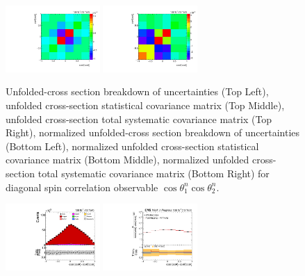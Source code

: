 \begin{refsection}
\begin{figure}[htb]
\begin{center}
 \includegraphics[width=0.32\textwidth]{fig_fullRun2UL/unfolding/combined/StatCovMatrixNorm_rebinnedB_c_nn.pdf}
 \includegraphics[width=0.32\textwidth]{fig_fullRun2UL/unfolding/combined/TotalSystCovMatrixNorm_rebinnedB_c_nn.pdf} \\
\caption{Unfolded-cross section breakdown of uncertainties (Top Left), unfolded cross-section statistical covariance matrix (Top Middle), unfolded cross-section total systematic covariance matrix (Top Right), normalized unfolded-cross section breakdown of uncertainties (Bottom Left), normalized unfolded cross-section statistical covariance matrix (Bottom Middle), normalized unfolded cross-section total systematic covariance matrix (Bottom Right) for diagonal spin correlation observable $\cos\theta_{1}^{n}\cos\theta_{2}^{n}$.}
\label{fig:c_nn_uncertainties}
\end{center}
\end{figure}
\clearpage
\begin{figure}[htb]
\begin{center}
 \includegraphics[width=0.32\textwidth]{fig_fullRun2UL/controlplots/combined/Hyp_LLBarCPrk.pdf}
 \includegraphics[width=0.32\textwidth]{fig_fullRun2UL/unfolding/combined/UnfoldedResults_c_Prk.pdf}

\end{center}
\end{figure}
\end{refsection}
